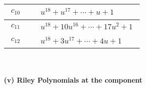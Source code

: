 \documentclass[1p]{elsarticle_modified}
\theoremstyle{definition}
\begin{document}
\begin{tabular}{m{50pt}|m{274pt}}
\hline $$\begin{aligned}c_{10}\end{aligned}$$&$\begin{aligned}
&u^{18}+u^{17}+\cdots+u+1
\end{aligned}$\\
\hline $$\begin{aligned}c_{11}\end{aligned}$$&$\begin{aligned}
&u^{18}+10 u^{16}+\cdots+17 u^2+1
\end{aligned}$\\
\hline $$\begin{aligned}c_{12}\end{aligned}$$&$\begin{aligned}
&u^{18}+3 u^{17}+\cdots+4 u+1
\end{aligned}$\\
\hline
\end{tabular}\\~\\
\newpage\renewcommand{\arraystretch}{1}
\flushleft \textbf{(v) Riley Polynomials at the component}\newline \\
\end{document}
